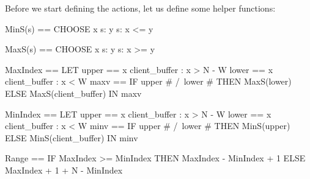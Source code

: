 Before we start defining the actions, let us define some helper functions:\newline
\begin{tla}
MinS(s) == 
    CHOOSE x \in s: \A y \in s: x <= y

MaxS(s) == 
    CHOOSE x \in s: \A y \in s: x >= y

MaxIndex == 
    LET 
        upper == {x \in client_buffer : x > N - W}
        lower == {x \in client_buffer : x < W}
        maxv == IF upper # {} /\ lower # {} 
                THEN 
                    MaxS(lower)
                ELSE 
                    MaxS(client_buffer)
    IN 
        maxv

MinIndex == 
    LET 
        upper == {x \in client_buffer : x > N - W}
        lower == {x \in client_buffer : x < W}
        minv == IF upper # {} /\ lower # {} 
                THEN 
                    MinS(upper)
                ELSE 
                    MinS(client_buffer)
    IN 
        minv

Range == 
    IF MaxIndex >= MinIndex
    THEN
        MaxIndex - MinIndex + 1
    ELSE 
        MaxIndex + 1 + N - MinIndex
\end{tla}
\begin{tlatex}
%
%
\@pvspace{8.0pt}%
%
%
\@pvspace{8.0pt}%
%
%
%
%
%
%
%
%
\@pvspace{8.0pt}%
%
%
%
%
%
%
%
%
\@pvspace{8.0pt}%
%
%
%
%
%
%
\end{tlatex}
\newline

